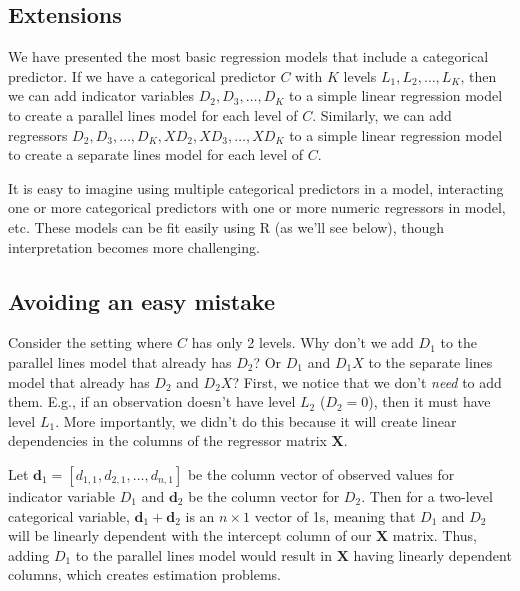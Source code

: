 \documentclass[
]{book}
\theoremstyle{definition}
\theoremstyle{definition}
\theoremstyle{definition}
\theoremstyle{definition}
\theoremstyle{remark}
\begin{document}
\hypertarget{extensions}{%
\subsection{Extensions}\label{extensions}}

We have presented the most basic regression models that include a categorical predictor. If we have a categorical predictor \(C\) with \(K\) levels \(L_1, L_2, \ldots, L_K\), then we can add indicator variables \(D_2, D_3, \ldots, D_K\) to a simple linear regression model to create a parallel lines model for each level of \(C\). Similarly, we can add regressors \(D_2, D_3, \ldots, D_K, X D_2, X D_3, \ldots, X D_K\) to a simple linear regression model to create a separate lines model for each level of \(C\).

It is easy to imagine using multiple categorical predictors in a model, interacting one or more categorical predictors with one or more numeric regressors in model, etc. These models can be fit easily using R (as we'll see below), though interpretation becomes more challenging.

\hypertarget{avoiding-an-easy-mistake}{%
\subsection{Avoiding an easy mistake}\label{avoiding-an-easy-mistake}}

Consider the setting where \(C\) has only 2 levels. Why don't we add \(D_1\) to the parallel lines model that already has \(D_2\)? Or \(D_1\) and \(D_1 X\) to the separate lines model that already has \(D_2\) and \(D_2 X\)? First, we notice that we don't \emph{need} to add them. E.g., if an observation doesn't have level \(L_2\) (\(D_2=0\)), then it must have level \(L_1\). More importantly, we didn't do this because it will create linear dependencies in the columns of the regressor matrix \(\mathbf{X}\).

Let \(\mathbf{d}_1=[d_{1,1}, d_{2,1}, \ldots, d_{n,1}]\) be the column vector of observed values for indicator variable \(D_1\) and \(\mathbf{d}_2\) be the column vector for \(D_2\). Then for a two-level categorical variable, \(\mathbf{d}_1 + \mathbf{d}_2\) is an \(n\times 1\) vector of 1s, meaning that \(D_1\) and \(D_2\) will be linearly dependent with the intercept column of our \(\mathbf{X}\) matrix. Thus, adding \(D_1\) to the parallel lines model would result in \(\mathbf{X}\) having linearly dependent columns, which creates estimation problems.
\end{document}
